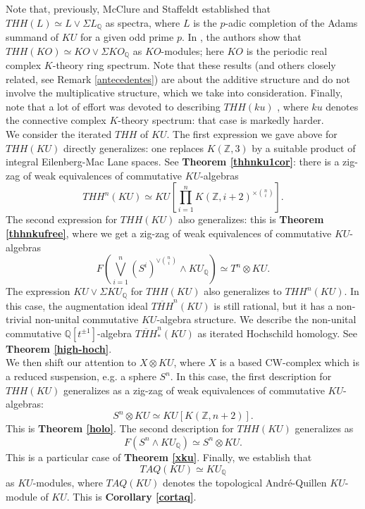 \documentclass[a4paper,11pt]{amsart} %
\theoremstyle{definition} \newtheorem{defn}[equation]{Definition}
\theoremstyle{remark} \newtheorem{notation}[equation]{Notation}
\theoremstyle{plain} \newtheorem{teo}[equation]{Theorem}
\theoremstyle{plain} \newtheorem{lema}[equation]{Lemma}
\theoremstyle{plain} \newtheorem{prop}[equation]{Proposition}
\theoremstyle{plain} \newtheorem{corolario}[equation]{Corollary}
\theoremstyle{remark} \newtheorem{obs}[equation]{Remark}
\theoremstyle{remark} \newtheorem{sideobs}[equation]{Side remark}
\theoremstyle{remark} \newtheorem{ejercicio}[equation]{Exercise}
\theoremstyle{definition} \newtheorem{notn}[equation]{Notation}
\theoremstyle{remark} \newtheorem{ej}[equation]{Example}
\theoremstyle{remark} \newtheorem{contraej}[equation]{Counterexample}
\theoremstyle{plain} \newtheorem{conj}[equation]{Conjecture}
\renewcommand{\1}{\ensuremath{\mathbbm{1}}}
\newcommand{\Q}{\mathbb{Q}}
\newcommand{\Z}{\mathbb{Z}}
\numberwithin{equation}{section}
\begin{document}
Note that, previously, McClure and Staffeldt \cite[8.1]{mc-st} established that $THH(L)\simeq L \vee \Sigma L_\Q$ as spectra, where $L$ is the $p$-adic completion of the Adams summand of $KU$ for a given odd prime $p$. In \cite[7.9]{thhko}, the authors show that $THH(KO)\simeq KO\vee \Sigma KO_\Q$ as $KO$-modules; here $KO$ is the periodic real complex $K$-theory ring spectrum. Note that these results (and others closely related, see Remark \ref{antecedentes}) are about the additive structure and do not involve the multiplicative structure, which we take into consideration. Finally, note that a lot of effort was devoted to describing $THH(ku)$ \cite{ausoni-thhku}, where $ku$ denotes the connective complex $K$-theory spectrum: that case is markedly harder.\\

%

We consider the iterated $THH$ of $KU$. The first expression we gave above for $THH(KU)$ directly generalizes: one replaces $K(\Z,3)$ by a suitable product of integral Eilenberg-Mac Lane spaces. See \textbf{Theorem \ref{thhnku1cor}}: there is a zig-zag of weak equivalences of commutative $KU$-algebras
\[THH^n(KU)\simeq KU\left[\prod\limits_{i=1}^n K(\Z,i+2)^{\times {n \choose i}}\right].\]
The second expression for $THH(KU)$ also generalizes: this is \textbf{Theorem \ref{thhnkufree}}, where we get a zig-zag of weak equivalences of commutative $KU$-algebras
\[F\left(\bigvee\limits_{i=1}^n (S^i)^{\vee {n\choose i}} \wedge KU_\Q\right) \simeq T^n\otimes KU.\]
The expression $KU \vee \Sigma KU_\Q$ for $THH(KU)$ also generalizes to $THH^n(KU)$. %
In this case, the augmentation ideal $\overline{THH}^n(KU)$ is still rational, but it has a non-trivial non-unital commutative $KU$-algebra structure. We describe the non-unital commutative $\Q[t^{\pm 1}]$-algebra $\overline{THH}^n_*(KU)$ as iterated Hochschild homology. See \textbf{Theorem \ref{high-hoch}}.%
\\

We then shift our attention to $X\otimes KU$, where $X$ is a based CW-complex which is a reduced suspension, e.g. a sphere $S^n$. In this case, the first description for $THH(KU)$ generalizes as a zig-zag of weak equivalences of commutative $KU$-algebras:
\[S^n\otimes KU \simeq KU[K(\Z,n+2)].\]
This is \textbf{Theorem \ref{holo}}. The second description for $THH(KU)$ generalizes as %
\[F(S^n \wedge KU_\Q) \simeq S^n\otimes KU.\] 
This is a particular case of \textbf{Theorem \ref{xku}}. Finally, we establish that
\[TAQ(KU)\simeq KU_\Q\]
as $KU$-modules, where $TAQ(KU)$ denotes the topological André-Quillen $KU$-module of $KU$. This is \textbf{Corollary \ref{cortaq}}.\\
\end{document}
